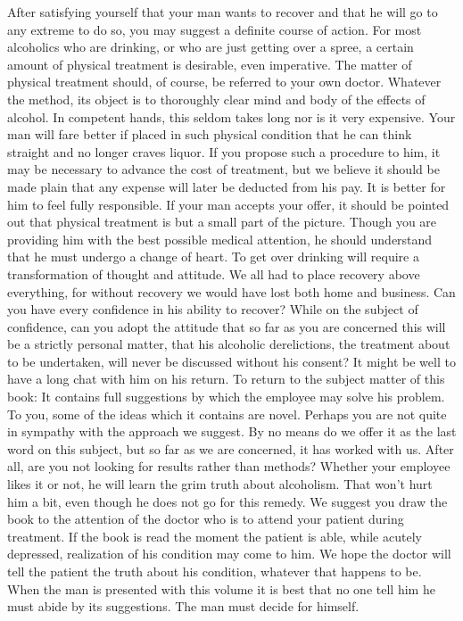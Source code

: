 \begin{biblechapter}
After satisfying yourself that your man wants to recover and that he will go to any extreme to do so, you may suggest a definite course of action.  For most alcoholics who are drinking, or who are just getting over a spree, a certain amount of physical treatment is desirable, even imperative.  The matter of physical treatment should, of course, be referred to your own doctor.  Whatever the method, its object is to thoroughly clear mind and body of the effects of alcohol.  In competent hands, this seldom takes long nor is it very expensive.  Your man will fare better if placed in such physical condition that he can think straight and no longer craves liquor.  If you propose such a procedure to him, it may be necessary to advance the cost of treatment, but we believe it should be made plain that any expense will later be deducted from his pay.  It is better for him to feel fully responsible.
If your man accepts your offer, it should be pointed out that physical treatment is but a small part of the picture.  Though you are providing him with the best possible medical attention, he should understand that he must undergo a change of heart.  To get over drinking will require a transformation of thought and attitude.  We all had to place recovery above everything, for without recovery we would have lost both home and business.
Can you have every confidence in his ability to recover?  While on the subject of confidence, can you adopt the attitude that so far as you are concerned this will be a strictly personal matter, that his alcoholic derelictions, the treatment about to be undertaken, will never be discussed without his consent?  It might be well to have a long chat with him on his return.
To return to the subject matter of this book:  It contains full suggestions by which the employee may solve his problem.  To you, some of the ideas which it contains are novel.  Perhaps you are not quite in sympathy with the approach we suggest.  By no means do we offer it as the last word on this subject, but so far as we are concerned, it has worked with us.  After all, are you not looking for results rather than methods?  Whether your employee likes it or not, he will learn the grim truth about alcoholism.  That won't hurt him a bit, even though he does not go for this remedy.
We suggest you draw the book to the attention of the doctor who is to attend your patient during treatment.  If the book is read the moment the patient is able, while acutely depressed, realization of his condition may come to him.
We hope the doctor will tell the patient the truth about his condition, whatever that happens to be.  When the man is presented with this volume it is best that no one tell him he must abide by its suggestions.  The man must decide for himself.

\end{biblechapter}
